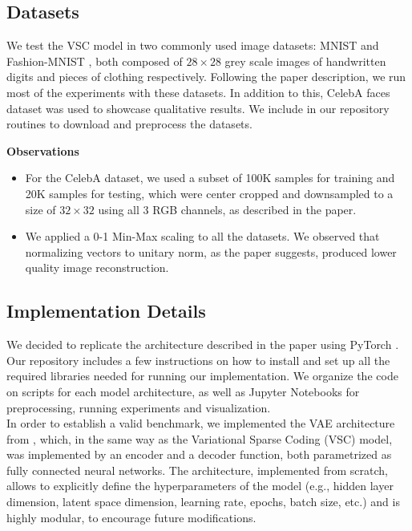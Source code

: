 \subsection{Datasets}

We test the VSC model in two commonly used image datasets: MNIST \supercite{lecun1998gradient} and Fashion-MNIST \supercite{xiao2017fashion}, both composed of $28 \times 28$ grey scale images of handwritten digits and pieces of clothing respectively. Following the paper description, we run most of the experiments with these datasets. In addition to this, CelebA faces \supercite{liu2015deep} dataset was used to showcase qualitative results. We include in our repository routines to download and preprocess the datasets.

\textbf{Observations}

\begin{itemize}
    \item For the CelebA dataset, we used a subset of 100K samples for training and 20K samples for testing, which were center cropped and downsampled to a size of $32 \times 32$ using all $3$ RGB channels, as described in the paper. 
    \item We applied a 0-1 Min-Max scaling to all the datasets. We observed that normalizing vectors to unitary norm, as the paper suggests, produced lower quality image reconstruction.
\end{itemize}

\subsection{Implementation Details}

We decided to replicate the architecture described in the paper using PyTorch \supercite{paszke2017automatic}. Our repository includes a few instructions on how to install and set up all the required libraries needed for running our implementation.  We organize the code on scripts for each model architecture, as well as Jupyter Notebooks for preprocessing, running experiments and visualization. \\

In order to establish a valid benchmark, we implemented the VAE architecture from \supercite{Kingma2013}, which, in the same way as the Variational Sparse Coding (VSC) model, was implemented by an encoder and a decoder function, both parametrized as fully connected neural networks. The architecture, implemented from scratch, allows to explicitly define the hyperparameters of the model (e.g., hidden layer dimension, latent space dimension, learning rate, epochs, batch size, etc.) and is highly modular, to encourage future modifications. \\

